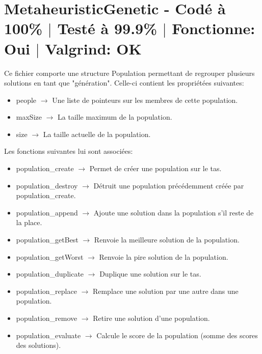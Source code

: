 \documentclass{EPUProjetPeiP}
\newcommand{\comp}[5]{
	\section[#1]{#1 {\small - Codé à #2\% $\vert$ Testé à #3\% $\vert$ Fonctionne: #4 $\vert$ Valgrind: #5}}
}
\begin{document}
\comp{MetaheuristicGenetic}{100}{99.9}{Oui}{OK}
Ce fichier comporte une structure Population permettant de regrouper plusieurs solutions en tant que "génération". Celle-ci contient les propriétées suivantes:
\begin{itemize}
	\item people $\longrightarrow$ Une liste de pointeurs sur les membres de cette population.
	\item maxSize $\longrightarrow$ La taille maximum de la population.
	\item size $\longrightarrow$ La taille actuelle de la population.\\
\end{itemize}

Les fonctions suivantes lui sont associées:
\begin{itemize}
	\item population\_create $\longrightarrow$ Permet de créer une population sur le tas.
	\item population\_destroy $\longrightarrow$ Détruit une population précédemment créée par population\_create.
	\item population\_append $\longrightarrow$ Ajoute une solution dans la population s'il reste de la place.
	\item population\_getBest $\longrightarrow$ Renvoie la meilleure solution de la population.
	\item population\_getWorst $\longrightarrow$ Renvoie la pire solution de la population.
	\item population\_duplicate $\longrightarrow$ Duplique une solution sur le tas.
	\item population\_replace $\longrightarrow$ Remplace une solution par une autre dans une population.
	\item population\_remove $\longrightarrow$ Retire une solution d'une population.
	\item population\_evaluate $\longrightarrow$ Calcule le score de la population (somme des scores des solutions).\\
\end{itemize}
\end{document}

